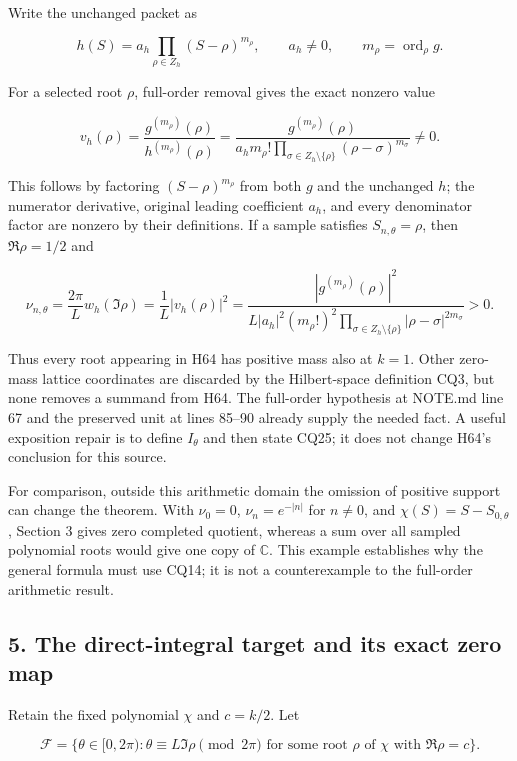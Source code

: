 \documentclass{article}
\begin{document}
Write the unchanged packet as

\[
h(S)=a_h\prod_{\rho\in Z_h}(S-\rho)^{m_\rho},
\qquad a_h\ne0,\qquad m_\rho=\operatorname{ord}_\rho g.
\tag{CQ23}
\]

For a selected root \(\rho\), full-order removal gives the exact nonzero value

\[
v_h(\rho)=
\frac{g^{(m_\rho)}(\rho)}{h^{(m_\rho)}(\rho)}=
\frac{g^{(m_\rho)}(\rho)}
{a_hm_\rho!\prod_{\sigma\in Z_h\setminus\{\rho\}}
(\rho-\sigma)^{m_\sigma}}\ne0.
\tag{CQ24}
\]

This follows by factoring \((S-\rho)^{m_\rho}\) from both \(g\) and the unchanged \(h\); the numerator derivative, original leading coefficient \(a_h\), and every denominator factor are nonzero by their definitions. If a sample satisfies \(S_{n,\theta}=\rho\), then \(\Re \rho=1/2\) and

\[
\nu_{n,\theta}
=\frac{2\pi}L w_h(\Im\rho)
=\frac1L|v_h(\rho)|^2
=\frac{|g^{(m_\rho)}(\rho)|^2}
{L|a_h|^2(m_\rho!)^2\prod_{\sigma\in Z_h\setminus\{\rho\}}|\rho-\sigma|^{2m_\sigma}}>0.
\tag{CQ25}
\]

Thus every root appearing in H64 has positive mass also at \(k=1\). Other zero-mass lattice coordinates are discarded by the Hilbert-space definition CQ3, but none removes a summand from H64. The full-order hypothesis at NOTE.md line 67 and the preserved unit at lines 85--90 already supply the needed fact. A useful exposition repair is to define \(I_\theta\) and then state CQ25; it does not change H64's conclusion for this source.

For comparison, outside this arithmetic domain the omission of positive support can change the theorem. With \(\nu_0=0\), \(\nu_n=e^{-|n|}\) for \(n \ne 0\), and \(\chi(S)=S-S_{0,\theta}\), Section 3 gives zero completed quotient, whereas a sum over all sampled polynomial roots would give one copy of \(\mathbb C\). This example establishes why the general formula must use CQ14; it is not a counterexample to the full-order arithmetic result.

\subsection{5. The direct-integral target and its exact zero map}\label{the-direct-integral-target-and-its-exact-zero-map}

Retain the fixed polynomial \(\chi\) and \(c=k/2\). Let

\[
\mathcal F=
\{\theta\in[0,2\pi):
\theta\equiv L\Im\rho\pmod{2\pi}
\text{ for some root }\rho\text{ of }\chi
\text{ with }\Re\rho=c\}.
\tag{CQ26}
\]
\end{document}
